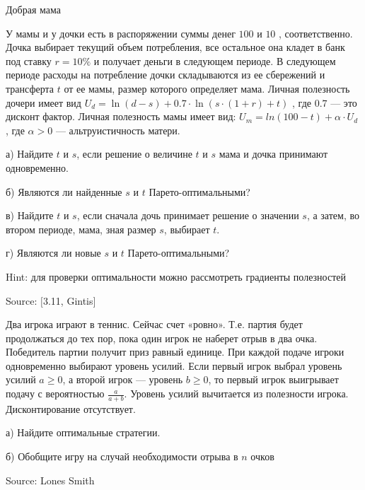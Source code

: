 \begin{problem}
 Добрая мама \par
У мамы и у дочки есть в распоряжении суммы денег  $100$  и  $10$ , соответственно. Дочка выбирает текущий объем потребления, все остальное она кладет в банк под ставку  $r=10\%$  и получает деньги в следующем периоде. В следующем периоде расходы на потребление дочки складываются из ее сбережений и трансферта  $t$  от ее мамы, размер которого определяет мама. Личная полезность дочери имеет вид  $U_{d} =\ln(d-s)+0.7\cdot \ln(s\cdot(1+r)+t)$ , где  $0.7$  — это дисконт фактор. Личная полезность мамы имеет вид:  $U_{m} =ln(100-t)+\alpha \cdot U_{d} $ , где  $\alpha >0$  — альтруистичность матери. \par
а) Найдите $t$ и $s$, если решение о величине $t$ и $s$ мама и дочка принимают одновременно. \par
б) Являются ли найденные $s$ и $t$ Парето-оптимальными? \par
в) Найдите $t$ и $s$, если сначала дочь принимает решение о значении $s$, а затем, во втором периоде, мама, зная размер $s$, выбирает $t$. \par
г) Являются ли новые $s$ и $t$ Парето-оптимальными? \par
Hint: для проверки оптимальности можно рассмотреть градиенты полезностей \par
Source: $[$3.11, Gintis$]$ \par



\begin{sol}

\end{sol}
\end{problem}



\begin{problem}

Два игрока играют в теннис. Сейчас счет «ровно». Т.е. партия будет продолжаться до тех пор, пока один игрок не наберет отрыв в два очка. Победитель партии получит приз равный единице. При каждой подаче игроки одновременно выбирают уровень усилий. Если первый игрок выбрал уровень усилий $a\ge 0$, а второй игрок — уровень $b\ge 0$, то первый игрок выигрывает подачу с вероятностью $\frac{a}{a+b}$. Уровень усилий вычитается из полезности игрока. Дисконтирование отсутствует. \par
а) Найдите оптимальные стратегии. \par
б) Обобщите игру на случай необходимости отрыва в $n$ очков \par
Source: Lones Smith



\begin{sol}

\end{sol}
\end{problem}



